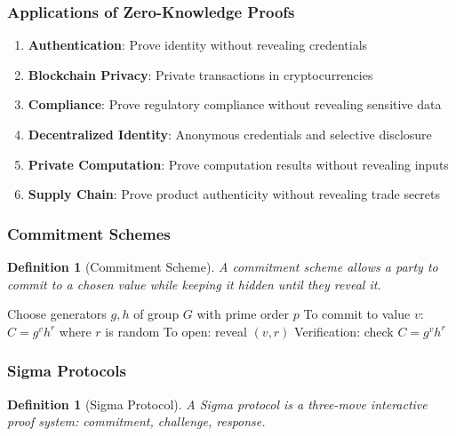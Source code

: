 \documentclass[11pt,a4paper]{article}
\newtheorem{definition}[theorem]{Definition}
\begin{document}
\subsubsection{Applications of Zero-Knowledge Proofs}

\begin{enumerate}
\item \textbf{Authentication}: Prove identity without revealing credentials
\item \textbf{Blockchain Privacy}: Private transactions in cryptocurrencies
\item \textbf{Compliance}: Prove regulatory compliance without revealing sensitive data
\item \textbf{Decentralized Identity}: Anonymous credentials and selective disclosure
\item \textbf{Private Computation}: Prove computation results without revealing inputs
\item \textbf{Supply Chain}: Prove product authenticity without revealing trade secrets
\end{enumerate}

\subsubsection{Commitment Schemes}

\begin{definition}[Commitment Scheme]
A commitment scheme allows a party to commit to a chosen value while keeping it hidden until they reveal it.
\end{definition}

\begin{algorithm}
\caption{Pedersen Commitment}
\begin{algorithmic}[1]
\STATE Choose generators $g, h$ of group $G$ with prime order $p$
\STATE To commit to value $v$: $C = g^v h^r$ where $r$ is random
\STATE To open: reveal $(v, r)$
\STATE Verification: check $C = g^v h^r$
\end{algorithmic}
\end{algorithm}

\subsubsection{Sigma Protocols}

\begin{definition}[Sigma Protocol]
A Sigma protocol is a three-move interactive proof system: commitment, challenge, response.
\end{definition}
\end{document}
